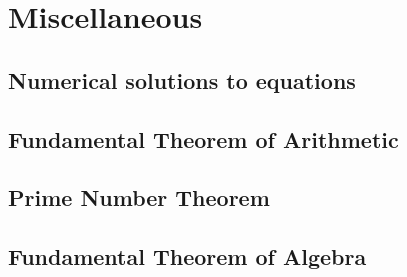 \documentclass[fleqn,a4paper,11pt]{article}
\begin{document}

    \section{Miscellaneous}

%

    \subsection{Numerical solutions to equations}

    \subsection{Fundamental Theorem of Arithmetic}

    \subsection{Prime Number Theorem}

    \subsection{Fundamental Theorem of Algebra}
\end{document}
